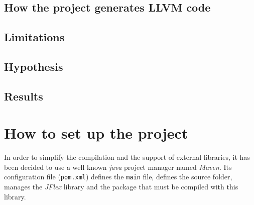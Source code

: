 \documentclass[a4paper,11pt]{article}
\begin{document}
  
  \subsection{How the project generates LLVM code}
    
    
  \subsection{Limitations}
  
  \subsection{Hypothesis}
  
  \subsection{Results}
    

\section{How to set up the project}
  In order to simplify the compilation and the support of external libraries, it has been decided to use a well known \textit{java} project manager named \textit{Maven}. Its configuration file (\verb|pom.xml|) defines the \verb|main| file, defines the source folder, manages the \textit{JFlex} library and the package that must be compiled with this library.
\end{document}

